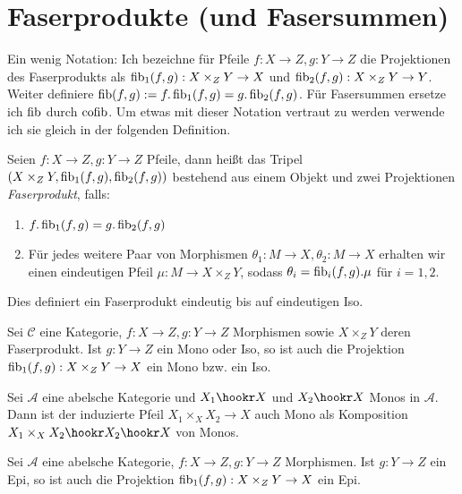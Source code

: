 \section{Faserprodukte (und Fasersummen)}

Ein wenig Notation: Ich bezeichne für Pfeile $f : X\to Z, g: Y\to Z$ die Projektionen des Faserprodukts als $\operatorname{fib}_1(f,g) : X\times_Z Y \to X$ und $\operatorname{fib}_2(f,g) : X\times_Z Y \to Y$. Weiter definiere $\operatorname{fib}(f,g) := f.\operatorname{fib}_1(f,g) = g.\operatorname{fib}_2(f,g)$.
Für Fasersummen ersetze ich $\operatorname{fib}$ durch $\operatorname{cofib}$.
Um etwas mit dieser Notation vertraut zu werden verwende ich sie gleich in der folgenden Definition.

\begin{defn}
Seien $f:X\to Z, g:Y\to Z$ Pfeile, dann heißt das Tripel $(X\times_Z Y, \operatorname{fib}_1(f,g), \operatorname{fib}_2(f,g))$ bestehend aus einem Objekt und zwei Projektionen \emph{Faserprodukt}, falls:
\begin{enumerate}
\item $f.\operatorname{fib}_1(f,g) = g.\operatorname{fib}_2(f,g)$
\item Für jedes weitere Paar von Morphismen $\theta_1 : M \to X, \theta_2 : M \to X$ erhalten wir einen eindeutigen Pfeil $\mu : M \to X\times_Z Y$, sodass $\theta_i = \operatorname{fib}_i(f,g) . \mu$ für $i=1,2$.
\end{enumerate}
Dies definiert ein Faserprodukt eindeutig bis auf eindeutigen Iso.
\end{defn}

\begin{prop} Sei $\mathcal C$ eine Kategorie, $f : X \to Z, g : Y\to Z$ Morphismen sowie $X\times_Z Y$ deren Faserprodukt. Ist $g: Y\to Z$ ein Mono oder Iso, so ist auch die Projektion $\operatorname{fib}_1(f,g): X\times_Z Y \to X$ ein Mono bzw. ein Iso.
\end{prop}

\begin{korr}
Sei $\mathcal A$ eine abelsche Kategorie und
$X_1 \hookr X$ und $X_2 \hookr X$ Monos in $\mathcal A$. Dann ist der induzierte Pfeil $X_1 \times_X X_2 \to X$ auch Mono als Komposition $X_1\times_X X_2 \hookr X_2 \hookr X$ von Monos.
\end{korr}

\begin{prop} Sei $\mathcal A$ eine abelsche Kategorie, $f : X \to Z, g : Y\to Z$ Morphismen. Ist $g: Y\to Z$ ein Epi, so ist auch die Projektion $\operatorname{fib}_1(f,g): X\times_Z Y \to X$ ein Epi.
\end{prop}

